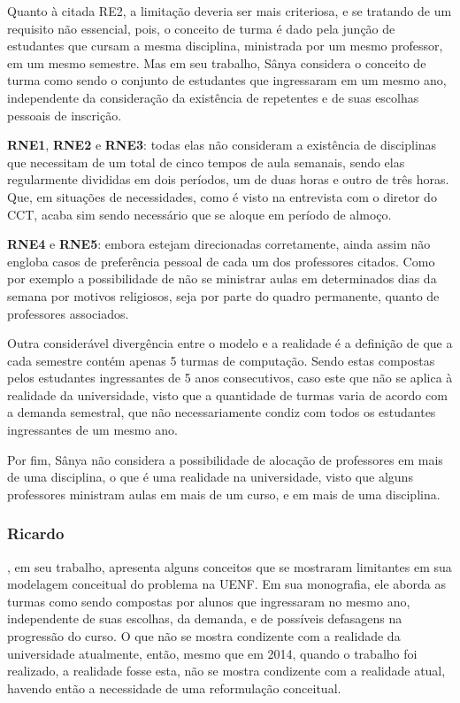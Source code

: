 Quanto à citada RE2, a limitação deveria ser mais criteriosa, e se tratando de um requisito não essencial, pois, o conceito de turma é dado pela junção de estudantes que cursam a mesma disciplina, ministrada por um mesmo professor, em um mesmo semestre. Mas em seu trabalho, Sânya considera o conceito de turma como sendo o conjunto de estudantes que ingressaram em um mesmo ano, independente da consideração da existência de repetentes e de suas escolhas pessoais de inscrição.

\textbf{RNE1}, \textbf{RNE2} e \textbf{RNE3}: todas elas não consideram a existência de disciplinas que necessitam de um total de cinco tempos de aula semanais, sendo elas regularmente divididas em dois períodos, um de duas horas e outro de três horas. Que, em situações de necessidades, como é visto na entrevista com o diretor do CCT, acaba sim sendo necessário que se aloque em período de almoço.

\textbf{RNE4} e \textbf{RNE5}: embora estejam direcionadas corretamente, ainda assim não engloba casos de preferência pessoal de cada um dos professores citados. Como por exemplo a possibilidade de não se ministrar aulas em determinados dias da semana por motivos religiosos, seja por parte do quadro permanente, quanto de professores associados.

Outra considerável divergência entre o modelo e a realidade é a definição de que a cada semestre contém apenas 5 turmas de computação. Sendo estas compostas pelos estudantes ingressantes de 5 anos consecutivos, caso este que não se aplica à realidade da universidade, visto que a quantidade de turmas varia de acordo com a demanda semestral, que não necessariamente condiz com todos os estudantes ingressantes de um mesmo ano.

Por fim, Sânya não considera a possibilidade de alocação de professores em mais de uma disciplina, o que é uma realidade na universidade, visto que alguns professores ministram aulas em mais de um curso, e em mais de uma disciplina.

\subsubsection{Ricardo}

, em seu trabalho, apresenta alguns conceitos que se mostraram limitantes em sua modelagem conceitual do problema na UENF. Em sua monografia, ele aborda as turmas como sendo compostas por alunos que ingressaram no mesmo ano, independente de suas escolhas, da demanda, e de possíveis defasagens na progressão do curso. O que não se mostra condizente com a realidade da universidade atualmente, então, mesmo que em 2014, quando o trabalho foi realizado, a realidade fosse esta, não se mostra condizente com a realidade atual, havendo então a necessidade de uma reformulação conceitual.

